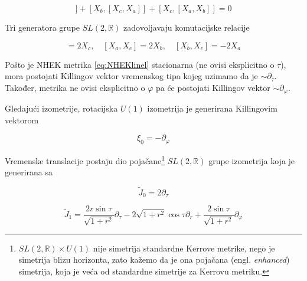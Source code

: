\begin{equation*}
[X_a,[X_b,X_c]]+[X_b,[X_c,X_a]]+[X_c,[X_a,X_b]]=0
\end{equation*}

\noindent Tri generatora grupe $SL(2,\mathbb{R})$ zadovoljavaju komutacijske relacije

\begin{equation*}
[X_a,X_b]=2X_c,\quad [X_a,X_c]=2X_b,\quad [X_b,X_c]=-2X_a
\end{equation*}

\bigskip


Pošto je NHEK metrika \eqref{eq:NHEKlinel} stacionarna (ne ovisi eksplicitno o $\tau$), mora postojati Killingov vektor vremenskog tipa kojeg uzimamo da je $\sim\partial_\tau$. Također, metrika ne ovisi eksplicitno o $\varphi$ pa će postojati Killingov vektor $\sim\partial_\varphi$.

\noindent Gledajući izometrije, rotacijska $U(1)$ izometrija je generirana Killingovim vektorom

\begin{equation}
\xi_0=-\partial_\varphi
\end{equation}

\noindent Vremenske translacije postaju dio pojačane\footnote{$SL(2,\mathbb{R})\times U(1)$ nije simetrija standardne Kerrove metrike, nego je simetrija blizu horizonta, zato kažemo da je ona pojačana (engl. \textit{enhanced}) simetrija, koja je veća od standardne simetrije za Kerrovu metriku.} $SL(2,\mathbb{R})$ grupe izometrija koja je generirana sa

\begin{equation}
\tilde{J}_0=2\partial_\tau
\end{equation}

\begin{equation}
\tilde{J}_1=\frac{2r\sin\tau}{\sqrt{1+r^2}}\partial_\tau-2\sqrt{1+r^2}\cos\tau\partial_r+\frac{2\sin\tau}{\sqrt{1+r^2}}\partial_\varphi
\end{equation}

